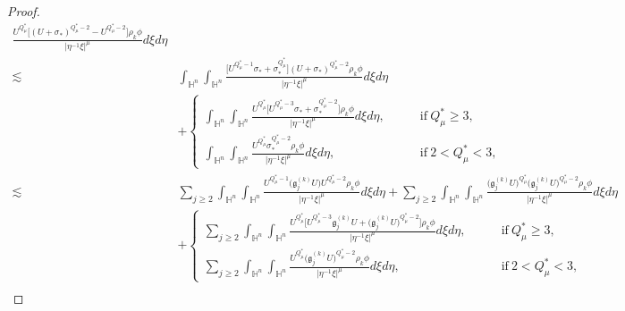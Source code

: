 \documentclass[11pt]{article}
\begin{document}
\begin{proof}
\begin{align}
  \frac{U^{Q^{\ast}_{\mu}}       \Big[(U+\sigma_* )^{Q^{\ast}_{\mu}-2}-U^{Q^{\ast}_{\mu}-2}\Big]\rho_k \phi}
{|\eta^{-1}\xi|^{\mu}}d\xi{d}\eta \nonumber\\
\lesssim &
 \int_{\mathbb{H}^{n}}\int_{\mathbb{H}^{n}}
  \frac{\Big[U^{Q^{\ast}_{\mu}-1}\sigma_* +\sigma_*^{Q^{\ast}_{\mu}}\Big]     (U+\sigma_*)^{Q^{\ast}_{\mu}-2} \rho_k   \phi
  }
{|\eta^{-1}\xi|^{\mu}}d\xi{d}\eta
\nonumber \\&+\begin{cases}
\displaystyle\int_{\mathbb{H}^{n}}\int_{\mathbb{H}^{n}}
  \frac{U^{Q^{\ast}_{\mu}}      \Big[U^{Q^{\ast}_{\mu}-3}\sigma_*+\sigma_*^{Q^{\ast}_{\mu}-2}\Big]\rho_k \phi}
{|\eta^{-1}\xi|^{\mu}}d\xi{d}\eta, \qquad &\mathrm{if}~Q_\mu^*\geq3,\nonumber \\
\displaystyle\int_{\mathbb{H}^{n}}\int_{\mathbb{H}^{n}}
  \frac{U^{Q^{\ast}_{\mu}}      \sigma_*^{Q^{\ast}_{\mu}-2}\rho_k \phi}
{|\eta^{-1}\xi|^{\mu}}d\xi{d}\eta, \qquad &\mathrm{if}~2< Q_\mu^*<3,
\end{cases}
\nonumber \\
\lesssim &
 \sum\limits_{j\geq2}\int_{\mathbb{H}^{n}}\int_{\mathbb{H}^{n}}
  \frac{U^{Q^{\ast}_{\mu}-1}\Big(\mathfrak{g}_j^{(k)} U\Big)   U^{Q^{\ast}_{\mu}-2} \rho_k \phi
  }
{|\eta^{-1}\xi|^{\mu}}d\xi{d}\eta+\sum\limits_{j\geq2}\int_{\mathbb{H}^{n}}\int_{\mathbb{H}^{n}}
  \frac{\Big(\mathfrak{g}_j^{(k)} U\Big)^{Q^{\ast}_{\mu}}     \Big(\mathfrak{g}_j^{(k)} U\Big)^{Q^{\ast}_{\mu}-2} \rho_k \phi
  }
{|\eta^{-1}\xi|^{\mu}}d\xi{d}\eta \nonumber\\
&+\begin{cases}
\displaystyle\sum\limits_{j\geq2}\int_{\mathbb{H}^{n}}\int_{\mathbb{H}^{n}}
  \frac{U^{Q^{\ast}_{\mu}}    \bigg[U^{Q^{\ast}_{\mu}-3}   \mathfrak{g}_j^{(k)} U+\Big(\mathfrak{g}_j^{(k)} U\Big)^{Q^{\ast}_{\mu}-2}\bigg]\rho_k \phi}
{|\eta^{-1}\xi|^{\mu}}d\xi{d}\eta, \qquad &\mathrm{if}~Q_\mu^*\geq3, \nonumber\\
\displaystyle\sum\limits_{j\geq2}\int_{\mathbb{H}^{n}}\int_{\mathbb{H}^{n}}
  \frac{U^{Q^{\ast}_{\mu}}       \Big(\mathfrak{g}_j^{(k)} U\Big)^{Q^{\ast}_{\mu}-2}\rho_k \phi}
{|\eta^{-1}\xi|^{\mu}}d\xi{d}\eta, \qquad &\mathrm{if}~2< Q_\mu^*<3,
\end{cases}
\\

\end{align}
\end{proof}
\end{document}

